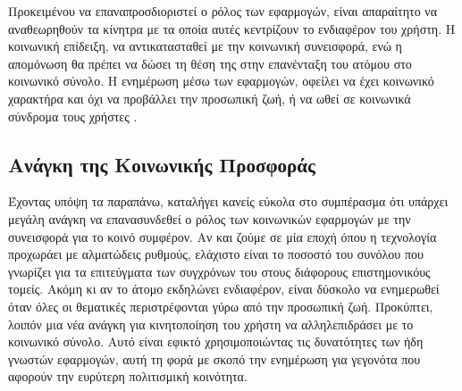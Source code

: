 Προκειμένου να επαναπροσδιοριστεί ο ρόλος των εφαρμογών, είναι απαραίτητο να αναθεωρηθούν τα κίνητρα με τα οποία αυτές κεντρίζουν το ενδιαφέρον του χρήστη. Η κοινωνική επίδειξη, να αντικατασταθεί με την κοινωνική συνεισφορά, ενώ η απομόνωση θα πρέπει να δώσει τη θέση της στην επανένταξη του ατόμου στο κοινωνικό σύνολο. Η ενημέρωση μέσω των εφαρμογών, οφείλει να έχει κοινωνικό χαρακτήρα και όχι να προβάλλει την προσωπική ζωή, ή να ωθεί σε κοινωνικά σύνδρομα τους χρήστες \cite{[BBC+18]}. 

\subsection{Ανάγκη της Κοινωνικής Προσφοράς}
Έχοντας υπόψη τα παραπάνω, καταλήγει κανείς εύκολα στο συμπέρασμα ότι υπάρχει μεγάλη ανάγκη να επανασυνδεθεί ο ρόλος των κοινωνικών εφαρμογών με την συνεισφορά για το κοινό συμφέρον. Αν και ζούμε σε μία εποχή όπου η τεχνολογία προχωράει με αλματώδεις ρυθμούς, ελάχιστο είναι το ποσοστό του συνόλου που γνωρίζει για τα επιτεύγματα των συγχρόνων του στους διάφορους επιστημονικόυς τομείς. Ακόμη κι αν το άτομο εκδηλώνει ενδιαφέρον, είναι δύσκολο να ενημερωθεί όταν όλες οι θεματικές περιστρέφονται γύρω από την προσωπική ζωή. Προκύπτει, λοιπόν μια νέα ανάγκη για κινητοποίηση του χρήστη να αλληλεπιδράσει με το κοινωνικό σύνολο. Αυτό είναι εφικτό χρησιμοποιώντας τις δυνατότητες των ήδη γνωστών εφαρμογών, αυτή τη φορά με σκοπό την ενημέρωση για γεγονότα που αφορούν την ευρύτερη πολιτισμική κοινότητα. 

